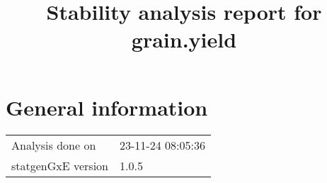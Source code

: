 \documentclass[a4paper,11pt]{article}\usepackage[]{graphicx}\usepackage[]{xcolor}
\title{Stability analysis report for grain.yield}%
\author{\vspace{-5ex}}
\date{\vspace{-5ex}}
\begin{document}
\maketitle
\singlespacing

\section{General information}
\begin{table}[ht]
\begin{flushleft}
\begin{tabular}{ll}
  Analysis done on & 23-11-24 08:05:36 \\ 
  statgenGxE version & 1.0.5 \\ 
  \end{tabular}
\label{general}
\end{flushleft}
\end{table}


\end{document}
